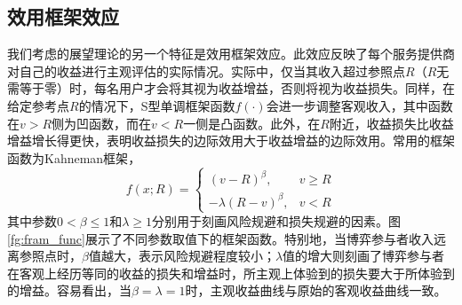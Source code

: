 \subsection{效用框架效应}
我们考虑的展望理论的另一个特征是效用框架效应。此效应反映了每个服务提供商对自己的收益进行主观评估的实际情况。实际中，仅当其收入超过参照点$R$（$R$无需等于零）时，每名用户才会将其视为收益增益，否则将视为收益损失。同样，在给定参考点$R$的情况下，S型单调框架函数$f(\cdot)$会进一步调整客观收入，其中函数在$v>R$侧为凹函数，而在$v<R$一侧是凸函数。此外，在$R$附近，收益损失比收益增益增长得更快，表明收益损失的边际效用大于收益增益的边际效用。常用的框架函数为Kahneman框架\cite{Kahneman}，
\begin{equation}\label{eq:framing}
f(x;R)=
\begin{cases}
(v - R)^{\beta}, &v\geq R\\
-\lambda(R-v)^{\beta}, &v<R
\end{cases}
\end{equation}
其中参数$0<\beta\leq 1$和$\lambda\geq 1$分别用于刻画风险规避和损失规避的因素。图\ref{fg:fram_func}展示了不同参数取值下的框架函数。特别地，当博弈参与者收入远离参照点时，$\beta$值越大，表示风险规避程度较小；$\lambda$值的增大则刻画了博弈参与者在客观上经历等同的收益的损失和增益时，所主观上体验到的损失要大于所体验到的增益。容易看出，当$\beta=\lambda=1$时，主观收益曲线与原始的客观收益曲线一致。


